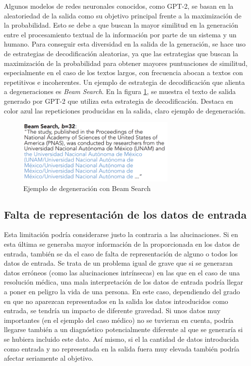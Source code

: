 Algunos modelos de redes neuronales conocidos, como GPT-2, se basan en la aleatoriedad de la salida como su objetivo principal frente a la maximización de la probabilidad. Esto se debe a que buscan la mayor similitud en la generación entre el procesamiento textual de la información por parte de un sistema y un humano. Para conseguir esta diversidad en la salida de la generación, se hace uso de estrategias de decodificación aleatorias, ya que las estrategias que buscan la maximización de la probabilidad para obtener mayores puntuaciones de similitud, especialmente en el caso de los textos largos, con frecuencia abocan a textos con repetitivos e incoherentes. Un ejemplo de estrategia de decodificación que alienta a degeneraciones es \textit{Beam Search}. En la figura \ref{fig:degeneracion}, se muestra el texto de salida generado por GPT-2 que utiliza esta estrategia de decodificación. Destaca en color azul las repeticiones producidas en la salida, claro ejemplo de degeneración.


\begin{figure}[!h]
	\centering
	\includegraphics[width=0.7\textwidth]{Imagenes/Bitmap/02EstadoDeLaCuestion/degeneracion}%
	\caption{Ejemplo de degeneración con Beam Search %
		\label{fig:degeneracion}}
\end{figure}

\subsection{Falta de representación de los datos de entrada}

Esta limitación podría considerarse justo la contraria a las alucinaciones. Si en esta última se generaba mayor información de la proporcionada en los datos de entrada, también se da el caso de falta de representación de alguno o todos los datos de entrada. Se trata de un problema igual de grave que si se generaran datos erróneos (como las alucinaciones intrínsecas) en las que en el caso de una resolución médica, una mala interpretación de los datos de entrada podría llegar a poner en peligro la vida de una persona. En este caso, dependiendo del grado en que no aparezcan representados en la salida los datos introducidos como entrada, se tendría un impacto de diferente gravedad. Si unos datos muy importantes (en el ejemplo del caso médico) no se tuvieran en cuenta, podría llegarse también a un diagnóstico potencialmente diferente al que se generaría si se hubiera incluido este dato. Así mismo, si el la cantidad de datos introducida como entrada y no representada en la salida fuera muy elevada también podría afectar seriamente al objetivo.



